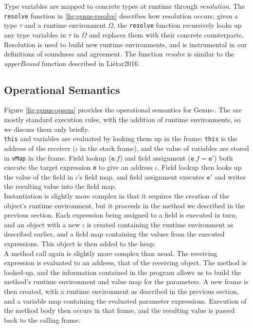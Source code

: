 Type variables are mapped to concrete types at runtime through \textit{resolution}. The \texttt{resolve} function in \ref{fig:genus-resolve} describes how resolution occurs; given a type $\tau$ and a runtime environment $\Omega$, the \texttt{resolve} function recursively looks up any type variables in $\tau$ in $\Omega$ and replaces them with their concrete counterparts. Resolution is used to build new runtime environments, and is instrumental in our definitions of soundness and agreement. The function \textit{resolve} is similar to the \textit{upperBound} function described in Liétar2016.

\subsection{Operational Semantics}

Figure \ref{fig:genus-opsem} provides the operational semantics for Genus-. The are mostly standard execution rules, with the addition of runtime environments, so we discuss them only briefly. \\

\texttt{this} and variables are evaluated by looking them up in the frame; \texttt{this} is the address of the receiver ($\iota$ in the stack frame), and the value of variables are stored in \texttt{vMap} in the frame. Field lookup ($\texttt{e}.f$) and field assignment ($\texttt{e}.f = \texttt{e}'$) both execute the target expression \texttt{e} to give an address $\iota$. Field lookup then looks up the value of the field in $\iota$'s field map, and field assignment executes $\texttt{e}'$ and writes the resulting value into the field map. \\

Instantiation is slightly more complex in that it requires the creation of the object's runtime environment, but it proceeds in the method we described in the previous section. Each expression being assigned to a field is executed in turn, and an object with a new $\iota$ is created containing the runtime environment as described earlier, and a field map containing the values from the executed expressions. This object is then added to the heap. \\

A method call again is slightly more complex than usual. The receiving expression is evaluated to an address, that of the receiving object. The method is looked-up, and the information contained in the program allows us to build the method's runtime environment and value map for the parameters. A new frame is then created, with a runtime environment as described in the previous section, and a variable map containing the evaluated parameter expressions. Execution of the method body then occurs in that frame, and the resulting value is passed back to the calling frame.

